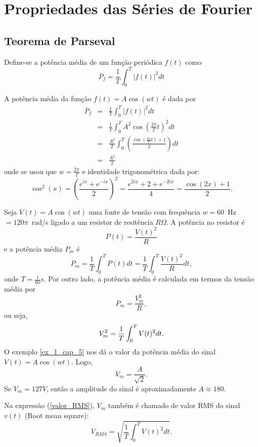 %
\chapter{Propriedades das Séries de Fourier}

\section{Teorema de Parseval}

\begin{defn} 
Define-se a potência média de um função periódica $f(t)$ como
$$\overline{P}_f=\frac{1}{T}\int_0^T |f(t)|^2dt$$
\end{defn}
\begin{ex}{\label{ex_1_cap_5}} A potência média da função $f(t)=A\cos(wt)$ é dada por
\begin{eqnarray*}
\overline{P}_f&=&\frac{1}{T}\int_0^T |f(t)|^2dt\\
&=&\frac{1}{T}\int_0^{T} A^2\cos\left(\frac{2\pi}{T} t\right)^2dt\\
&=&\frac{A^2}{T}\int_0^{T} \left(\frac{\cos\left(\frac{4\pi}{T} t\right)+1}{2}  \right)dt\\
&=&\frac{A^2}{2}
\end{eqnarray*}
 onde se usou que $w=\frac{2\pi}{T}$ e identidade trigonométrica dada por:
$$\cos^2(x)=\left(\frac{e^{ix}+e^{-ix}}{2}\right)^2=\frac{e^{2ix}+2+e^{-2ix}}{4}=\frac{\cos(2x)+1}{2}.$$
 \end{ex}
\begin{ex} Seja $V(t)=A\cos(wt)$ uma fonte de tensão com frequência $w=60$\ \!\!Hz $=120\pi$\ \!\!rad/s ligado a um resistor de resitência $R\Omega$. A potência no resistor é
$$
P(t)=\frac{V(t)^2}{R}
$$
e a potência média $P_m$ é
$$
P_m=\frac{1}{T}\int_0^TP(t)dt=\frac{1}{T}\int_0^T\frac{V(t)^2}{R}dt,
$$
onde $T=\frac{1}{60}s$. Por outro lado, a potência média é calculada em termos da tensão média por
$$
P_m=\frac{V_m^2}{R},
$$
ou seja,
\begin{equation}{\label{valor_RMS}}
V_m^2=\frac{1}{T}\int_0^T V(t)^2 dt.
\end{equation}
O exemplo \ref{ex_1_cap_5} nos dá o valor da potência média do sinal $V(t)=A\cos(wt)$. Logo,
$$
V_m=\frac{A}{\sqrt{2}}.
$$
Se $V_m=127V$, então a amplitude do sinal é aproximadamente $A\approx 180$.
\end{ex}
\begin{obs}Na expressão (\ref{valor_RMS}), $V_m$ também é chamado de valor RMS do sinal $v(t)$ (Root mean square):
$$
V_{RMS}=\sqrt{\frac{1}{T}\int_0^T V(t)^2 dt}.
$$
\end{obs}

